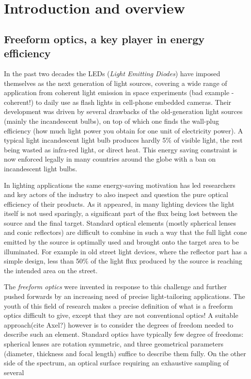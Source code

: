 \chapter{Introduction and overview}
\label{ch:intro}

\section{Freeform optics, a key player in energy efficiency}
In the past two decades the LEDs (\emph{Light Emitting Diodes}) have
imposed themselves as the next generation of light sources, covering a 
wide range of application from coherent light emission in space
experiments (\TODO bad example - coherent!) to daily use as flash lights in cell-phone embedded cameras. 
Their development was driven by several drawbacks of the old-generation 
light sources (mainly the incandescent bulbs), on top of which one finds the wall-plug efficiency (how much
light power you obtain for one unit of electricity power). A typical light 
incandescent light bulb produces hardly 5\% of visible light, the rest being wasted
as infra-red light, or direct heat. This energy saving constraint is now enforced 
legally in many countries around the globe with a ban on incandescent light bulbs.

In lighting applications the same energy-saving motivation has led researchers and 
key actors of the industry to also inspect and question the pure optical efficiency 
of their products. As it appeared, in many lighting devices the light itself is 
not used sparingly, a significant part of the flux being lost between the source
and the final target. Standard optical elements (mostly spherical lenses and conic
reflectors) are
difficult to combine in such a way that the full light cone emitted by the 
source is optimally used and brought onto the target area to be illuminated. For 
example in old street light devices, where 
the reflector part has a simple design, less than 50\% of the light flux produced
by the source is reaching the intended area on the street.

The \emph{freeform optics} were invented in response to this challenge 
and further pushed forwards by an increasing need of
precise light-tailoring applications. The youth of this field of research
makes a precise definition of what is a freeform optics difficult to give, 
except that they are not conventional optics! A suitable approach(\TODO cite Axel?) however is to 
consider the degrees of freedom needed to describe such an element. Standard optics
have typically few degree of freedoms: spherical lenses are rotation symmetric, and 
three geometrical parameters (diameter, thickness and focal length) suffice 
to describe them fully. On the other side of the spectrum, an optical 
surface requiring an exhaustive sampling of several 


